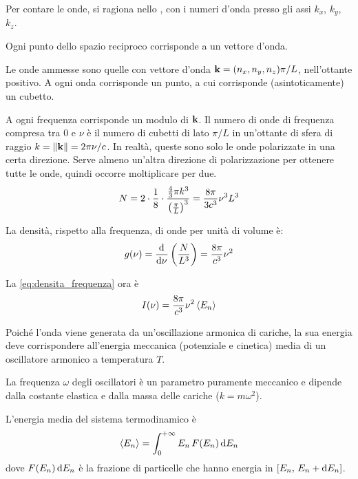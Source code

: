 Per contare le onde, si ragiona nello , con i numeri d'onda presso gli assi $k_x$, $k_y$, $k_z$.

Ogni punto dello spazio reciproco corrisponde a un vettore d'onda.

Le onde ammesse sono quelle con vettore d'onda $\mathbf{k} = (n_x, n_y, n_z) \pi/L$, nell'ottante positivo. A ogni onda corrisponde un punto, a cui corrisponde (asintoticamente) un cubetto.

A ogni frequenza corrisponde un modulo di $\mathbf{k}$.
Il numero di onde di frequenza compresa tra $0$ e $\nu$ è il numero di cubetti di lato $\pi / L$ in un'ottante di sfera di raggio $k = \left\lVert \mathbf{k} \right\rVert = 2\pi \nu / c$.
In realtà, queste sono solo le onde polarizzate in una certa direzione.
Serve almeno un'altra direzione di polarizzazione per ottenere tutte le onde, quindi occorre moltiplicare per due.
\begin{equation}
    N = 2 \cdot \frac{1}{8} \cdot \frac{\frac{4}{3} \pi k^3}{\left( \frac{\pi}{L} \right)^3}
    = \frac{8 \pi}{3 c^3} \nu^3 L^3
\end{equation}

La densità, rispetto alla frequenza, di onde per unità di volume è:
\begin{equation}
    g(\nu) = \der{\nu} \pts{\frac{N}{L^3}}
    = \frac{8 \pi}{c^3} \nu^2
\end{equation}

La \eqref{eq:densita_frequenza} ora è
\begin{equation}
    I(\nu) = \frac{8 \pi}{c^3} \nu^2 \left\langle {E_n} \right\rangle
\end{equation}

Poiché l'onda viene generata da un'oscillazione armonica di cariche, la sua energia deve corrispondere all'energia meccanica (potenziale e cinetica) media di un oscillatore armonico a temperatura $T$.

La frequenza $\omega$ degli oscillatori è un parametro puramente meccanico e dipende dalla costante elastica e dalla massa delle cariche ($k = m \omega^2$).

L'energia media del sistema termodinamico è
\begin{equation}
\label{eq:energia_media}
    \left\langle {E_n} \right\rangle = \int_0^{+\infty} {E_n} \, F({E_n}) \, \mathrm{d} {E_n}
\end{equation}
dove $F({E_n}) \, \mathrm{d} {E_n}$ è la frazione di particelle che hanno energia in $[{E_n}, \, {E_n} + \mathrm{d} {E_n}]$.

